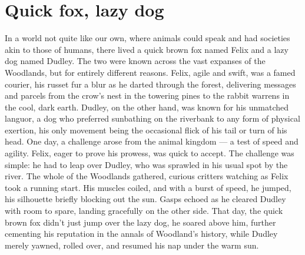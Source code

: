 \documentclass[11pt]{article}
\begin{document}
\section{Quick fox, lazy dog}

In a world not quite like our own, where animals could speak and had societies akin to those of humans, there lived a
quick brown fox named Felix and a lazy dog named Dudley. The two were known across the vast expanses of the Woodlands,
but for entirely different reasons. Felix, agile and swift, was a famed courier, his russet fur a blur as he darted
through the forest, delivering messages and parcels from the crow's nest in the towering pines to the rabbit warrens in
the cool, dark earth. Dudley, on the other hand, was known for his unmatched languor, a dog who preferred sunbathing on
the riverbank to any form of physical exertion, his only movement being the occasional flick of his tail or turn of his
head. One day, a challenge arose from the animal kingdom — a test of speed and agility. Felix, eager to prove his
prowess, was quick to accept. The challenge was simple: he had to leap over Dudley, who was sprawled in his usual spot
by the river. The whole of the Woodlands gathered, curious critters watching as Felix took a running start. His muscles
coiled, and with a burst of speed, he jumped, his silhouette briefly blocking out the sun. Gasps echoed as he cleared
Dudley with room to spare, landing gracefully on the other side. That day, the quick brown fox didn't just jump over the
 lazy dog, he soared above him, further cementing his reputation in the annals of Woodland's history, while Dudley
 merely yawned, rolled over, and resumed his nap under the warm sun.
\end{document}
